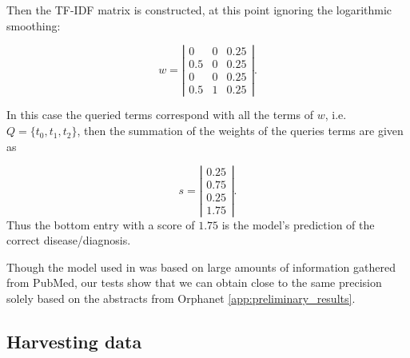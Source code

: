 \documentclass[10pt,letterpaper,final]{article}
\begin{document}
Then the TF-IDF matrix is constructed, at this point ignoring the
logarithmic smoothing:

\[ w = \left| \begin{array}{ccc}
0 & 0 & 0.25 \\
0.5 & 0 & 0.25 \\
0 & 0 & 0.25 \\
0.5 & 1 & 0.25  \end{array} \right|.
\]

In this case the queried terms correspond with all the terms of
$w$, i.e. $Q = \{t_{0}, t_{1}, t_{2}\}$, then the summation of the
weights of the queries terms are given as

\[ s = \left| \begin{array}{c}
0.25 \\
0.75 \\
0.25 \\
1.75 \end{array} \right|.
\]
Thus the bottom entry with a score of $1.75$ is the model's prediction
of the correct disease/diagnosis. \newline

Though the model used in \cite{jensenandersen} was based on large
amounts of information gathered from PubMed, our tests show that we
can obtain close to the same precision solely based on the abstracts
from Orphanet \ref{app:preliminary_results}.



\subsection{Harvesting data}
\end{document}
